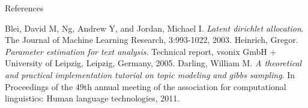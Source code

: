 \documentclass{beamer}
\begin{document}
\begin{frame}{References}

\footnotesize{
\begin{thebibliography}{99} %
 Blei, David M, Ng, Andrew Y, and Jordan, Michael I. \textit{Latent dirichlet allocation}. The Journal of Machine Learning Research, 3:993-1022, 2003.
 Heinrich, Gregor. \textit{Parameter estimation for text analysis}. Technical report, vsonix GmbH + University of Leipzig, Leipzig, Germany, 2005.
 Darling, William M. \textit{A theoretical and practical implementation tutorial on topic modeling and gibbs sampling}. In Proceedings of the 49th annual meeting of the association for computational linguistics: Human language technologies, 2011.
\end{thebibliography}
}
\end{frame}
\end{document}

